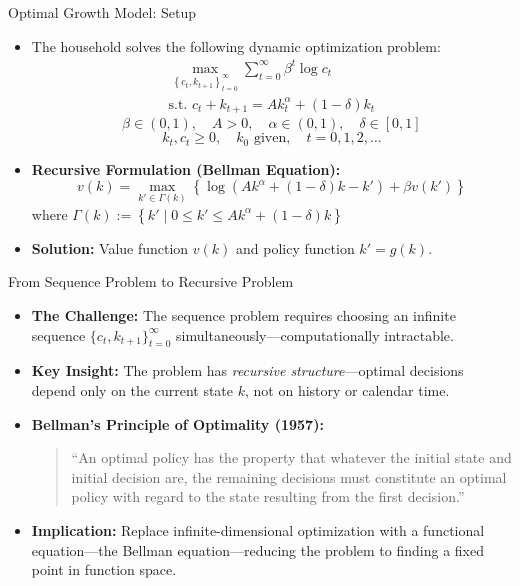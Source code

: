 \documentclass[10pt,english,aspectratio=169]{beamer}
\begin{document}
\begin{frame}{Optimal Growth Model: Setup}
\begin{itemize}
\item The household solves the following dynamic optimization problem:
\begin{gather*}
\max_{\left\{ c_{t},k_{t+1}\right\} _{t=0}^{\infty}}\sum_{t=0}^{\infty}\beta^{t}\log c_{t} \\
\text{s.t. } c_{t}+k_{t+1}=Ak_{t}^{\alpha}+(1-\delta)k_{t}
\end{gather*}
\[
\beta\in(0,1),\quad A>0,\quad \alpha\in(0,1),\quad \delta\in[0,1]
\]
\[
k_{t}, c_{t}\geq0,\quad k_{0}\text{ given}, \quad t=0,1,2,\dots
\]
\item \textbf{Recursive Formulation (Bellman Equation):}
\[
v(k)=\max_{k' \in \Gamma(k)}\left\{ \log\left(Ak^{\alpha}+(1-\delta)k - k'\right)+\beta v(k') \right\}
\]
where $\Gamma(k) := \left\{ k' \mid 0 \leq k' \leq Ak^{\alpha}+(1-\delta)k \right\}$
\item \textbf{Solution:} Value function $v(k)$ and policy function $k'=g(k)$.
\end{itemize}
\end{frame}

\begin{frame}{From Sequence Problem to Recursive Problem}
\begin{itemize}
\item \textbf{The Challenge:} The sequence problem requires choosing an infinite sequence $\{c_t, k_{t+1}\}_{t=0}^{\infty}$ simultaneously---computationally intractable.

\medskip
\item \textbf{Key Insight:} The problem has \emph{recursive structure}---optimal decisions depend only on the current state $k$, not on history or calendar time.

\medskip
\item \textbf{Bellman's Principle of Optimality (1957):}
\begin{quote}
``An optimal policy has the property that whatever the initial state and initial decision are, the remaining decisions must constitute an optimal policy with regard to the state resulting from the first decision.''
\end{quote}

\medskip
\item \textbf{Implication:} Replace infinite-dimensional optimization with a functional equation---the Bellman equation---reducing the problem to finding a fixed point in function space.
\end{itemize}
\end{frame}
\end{document}
